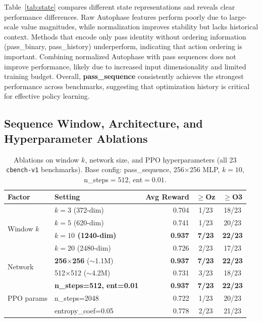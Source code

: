\documentclass{article}
\begin{document}
Table~\ref{tab:state} compares different state representations and reveals clear performance differences. Raw Autophase features perform poorly due to large-scale value magnitudes, while normalization improves stability but lacks historical context. Methods that encode only pass identity without ordering information (pass\_binary, pass\_history) underperform, indicating that action ordering is important. Combining normalized Autophase with pass sequences does not improve performance, likely due to increased input dimensionality and limited training budget. Overall, \textbf{pass\_sequence} consistently achieves the strongest performance across benchmarks, suggesting that optimization history is critical for effective policy learning.

\subsection{Sequence Window, Architecture, and Hyperparameter Ablations}

\begin{table}[ht]
  \caption{Ablations on window $k$, network size, and PPO hyperparameters
           (all 23 \texttt{cbench-v1} benchmarks).
           Base config: pass\_sequence, 256$\times$256 MLP, $k{=}10$,
           n\_steps$=512$, ent$=0.01$.}
  \label{tab:ablations}
  \centering
  \begin{tabular}{llrcc}
    \toprule
    Factor & Setting & Avg Reward & $\geq$Oz & $\geq$O3 \\
    \midrule
    \multirow{4}{*}{Window $k$}
      & $k=3$  (372-dim)  & 0.704 & 1/23 & 18/23 \\
      & $k=5$  (620-dim)  & 0.741 & 1/23 & 20/23 \\
      & \textbf{$k=10$ (1240-dim)} & \textbf{0.937} & \textbf{7/23} & \textbf{22/23} \\
      & $k=20$ (2480-dim) & 0.726 & 2/23 & 17/23 \\
    \midrule
    \multirow{2}{*}{Network}
      & \textbf{256$\times$256} ($\sim$1.1M)   & \textbf{0.937} & \textbf{7/23} & \textbf{22/23} \\
      & 512$\times$512 ($\sim$4.2M)   & 0.731 & 3/23 & 18/23 \\
    \midrule
    \multirow{3}{*}{PPO params}
      & \textbf{n\_steps=512, ent=0.01} & \textbf{0.937} & \textbf{7/23} & \textbf{22/23} \\
      & n\_steps=2048             & 0.722 & 1/23 & 20/23 \\
      & entropy\_coef=0.05        & 0.778 & 2/23 & 21/23 \\
    \bottomrule
  \end{tabular}
\end{table}
\end{document}
